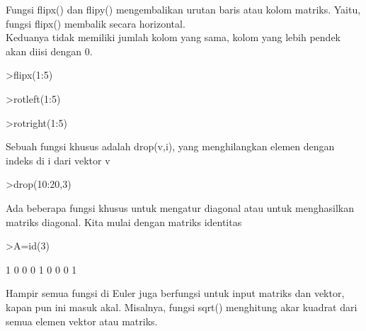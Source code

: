 \documentclass[a4paper,10pt]{article}
\begin{document}
\begin{eulernotebook}
\begin{eulercomment}
\begin{eulercomment}
\begin{eulercomment}
\begin{eulercomment}
\begin{euleroutput}
\end{euleroutput}
\begin{eulercomment}
Fungsi flipx() dan flipy() mengembalikan urutan baris atau kolom
matriks. Yaitu, fungsi flipx() membalik secara horizontal.\\
Keduanya tidak memiliki jumlah kolom yang sama, kolom yang lebih
pendek akan diisi dengan 0.
\end{eulercomment}
\begin{eulerprompt}
>flipx(1:5)
\end{eulerprompt}
\begin{euleroutput}
  [5,  4,  3,  2,  1]
\end{euleroutput}
\begin{eulerprompt}
>rotleft(1:5)
\end{eulerprompt}
\begin{euleroutput}
  [2,  3,  4,  5,  1]
\end{euleroutput}
\begin{eulerprompt}
>rotright(1:5)
\end{eulerprompt}
\begin{euleroutput}
  [5,  1,  2,  3,  4]
\end{euleroutput}
\begin{eulercomment}
Sebuah fungsi khusus adalah drop(v,i), yang menghilangkan elemen
dengan indeks di i dari vektor v
\end{eulercomment}
\begin{eulerprompt}
>drop(10:20,3)
\end{eulerprompt}
\begin{euleroutput}
  [10,  11,  13,  14,  15,  16,  17,  18,  19,  20]
\end{euleroutput}
\begin{eulercomment}
Ada beberapa fungsi khusus untuk mengatur diagonal atau untuk
menghasilkan matriks diagonal. Kita mulai dengan matriks identitas
\end{eulercomment}
\begin{eulerprompt}
>A=id(3)
\end{eulerprompt}
\begin{euleroutput}
              1             0             0 
              0             1             0 
              0             0             1 
\end{euleroutput}
\begin{eulercomment}
Hampir semua fungsi di Euler juga berfungsi untuk input matriks dan
vektor, kapan pun ini masuk akal. Misalnya, fungsi sqrt() menghitung
akar kuadrat dari semua elemen vektor atau matriks.


\end{eulercomment}
\end{eulercomment}
\end{eulercomment}
\end{eulercomment}
\end{eulercomment}
\end{eulernotebook}
\end{document}
